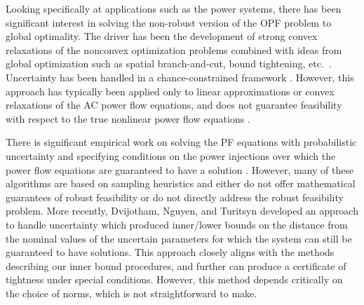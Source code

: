 Looking specifically at applications such as the power systems, there has been significant interest in solving the non-robust version of the OPF problem to global optimality.
The driver has been the development of strong convex relaxations of the nonconvex optimization problems combined with ideas from global optimization such as spatial branch-and-cut, bound tightening, etc.~\cite{BiMu2016,coffrin2015strengthening}.
Uncertainty has been handled in a chance-constrained framework \cite{BiChHa2014,zhang2011chance}.
However, this approach has typically been applied only to linear approximations or convex relaxations of the AC power flow equations, and does not guarantee feasibility with respect to the true nonlinear power flow equations \cite{BiChHa2014,kocuk2016strong,RoVrOlAn2015,TsBiTa2016}.

There is significant empirical work on solving the PF equations with probabilistic uncertainty \cite{morales2007point,wang1992interval} and specifying conditions on the power injections over which the power flow equations are guaranteed to have a solution \cite{bolognani2016existence,EPFLA,EPFLB}.
However, many of these algorithms are based on sampling heuristics and either do not offer mathematical guarantees of robust feasibility or do not directly address the robust feasibility problem.
More recently, Dvijotham, Nguyen, and Turitsyn \cite{DjTuritsyn} developed an approach to handle uncertainty which produced inner/lower bounds on the distance from the nominal values of the uncertain parameters for which the system can still be guaranteed to have solutions.
This approach closely aligns with the methods describing our inner bound procedures, and further can produce a certificate of tightness under special conditions. 
However, this method depends critically on the choice of norms, which is not straightforward to make.
